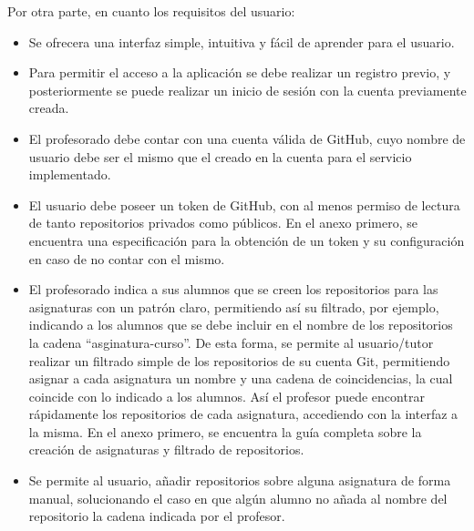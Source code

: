 Por otra parte, en cuanto los requisitos del usuario:
\begin{itemize}
	\item Se ofrecera una interfaz simple, intuitiva y fácil de aprender para el usuario.
	\item Para permitir el acceso a la aplicación se debe realizar un registro previo, y posteriormente se puede realizar un inicio de sesión con la cuenta previamente creada.
	\item El profesorado debe contar con una cuenta válida de GitHub, cuyo nombre de usuario debe ser el mismo que el creado en la cuenta para el servicio implementado.
 	\item El usuario debe poseer un token de GitHub, con al menos permiso de lectura de tanto repositorios privados como públicos. En el anexo primero, se encuentra una especificación para la obtención de un token y su configuración en caso de no contar con el mismo.
	\item El profesorado indica a sus alumnos que se creen los repositorios para las asignaturas con un patrón claro, permitiendo así su filtrado, por ejemplo, indicando a los alumnos que se debe incluir en el nombre de los repositorios la cadena ``asginatura-curso''. De esta forma, se permite al usuario/tutor realizar un filtrado simple de los repositorios de su cuenta Git, permitiendo asignar a cada asignatura un nombre y una cadena de coincidencias, la cual coincide con lo indicado a los alumnos. Así el profesor puede encontrar rápidamente los repositorios de cada asignatura, accediendo con la interfaz a la misma. En el anexo primero, se encuentra la guía completa sobre la creación de asignaturas y filtrado de repositorios.
	\item Se permite al usuario, añadir repositorios sobre alguna asignatura de forma manual, solucionando el caso en que algún alumno no añada al nombre del repositorio la cadena indicada por el profesor.
\end{itemize}







